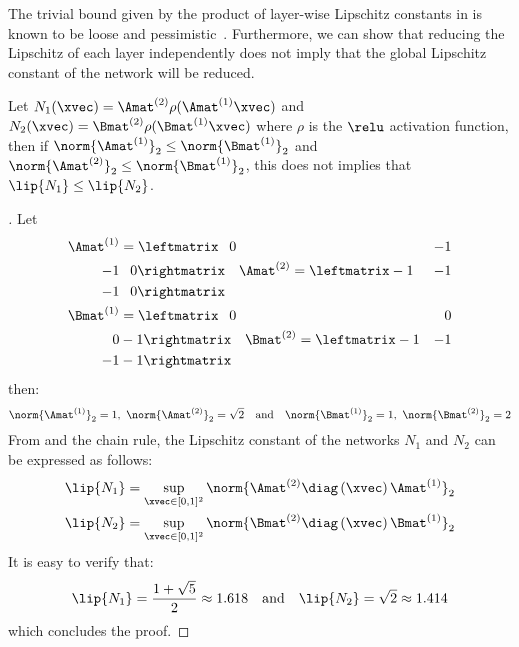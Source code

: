 The trivial bound given by the product of layer-wise Lipschitz constants in  is known to be loose and pessimistic~\citet{combettes2019lipschitz}.
Furthermore, we can show that reducing the Lipschitz of each layer independently does not imply that the global Lipschitz constant of the network will be reduced. 
\begin{proposition}
  Let $N_1(\xvec) = \Amat^{(2)} \rho(\Amat^{(1)} \xvec)$ and $N_2(\xvec) = \Bmat^{(2)} \rho(\Bmat^{(1)} \xvec)$ where $\rho$ is the $\relu$ activation function, then if $\norm{\Amat^{(1)}}_2 \leq \norm{\Bmat^{(1)}}_2$ and $\norm{\Amat^{(2)}}_2 \leq \norm{\Bmat^{(1)}}_2$, this does not implies that $\lip{N_1} \leq \lip{N_2}$.
  \label{proposition:ch3-limit_bound_lipschitz}
\end{proposition}
\begin{proof}[]
  Let
  \begin{align*}
    \Amat^{(1)} &= \leftmatrix 
      \phantom{+}0 & -1 \\ -1 & \phantom{+}0
    \rightmatrix \quad
    \Amat^{(2)}  = \leftmatrix
      -1 & -1 \\ -1 & \phantom{+}0
    \rightmatrix \\
    \Bmat^{(1)} &= \leftmatrix
      \phantom{+}0 & \phantom{+}0 \\ \phantom{+}0 & -1
    \rightmatrix \quad
    \Bmat^{(2)} = \leftmatrix
      -1 & -1 \\ -1 & -1
    \rightmatrix
  \end{align*}
  then:
  \begin{equation*}
    \norm{\Amat^{(1)}}_2 = 1,\ \norm{\Amat^{(2)}}_2 = \sqrt{2}
    \quad \text{and} \quad
    \norm{\Bmat^{(1)}}_2 = 1,\ \norm{\Bmat^{(2)}}_2 = 2
  \end{equation*}
  From  and the chain rule, the Lipschitz constant of the networks $N_1$ and $N_2$ can be expressed as follows:
  \begin{align*}
    \lip{N_1} &= \sup_{\xvec \in [0, 1]^2} \norm{\Amat^{(2)} \diag\left(\xvec\right) \Amat^{(1)}}_2 \\
    \lip{N_2} &= \sup_{\xvec \in [0, 1]^2} \norm{\Bmat^{(2)} \diag\left(\xvec\right) \Bmat^{(1)}}_2
  \end{align*}
  It is easy to verify that:
  \begin{equation*}
    \lip{N_1} = \frac{1 + \sqrt{5}}{2} \approx 1.618 \quad \text{and} \quad \lip{N_2} = \sqrt{2} \approx 1.414
  \end{equation*}
  which concludes the proof.
\end{proof}

